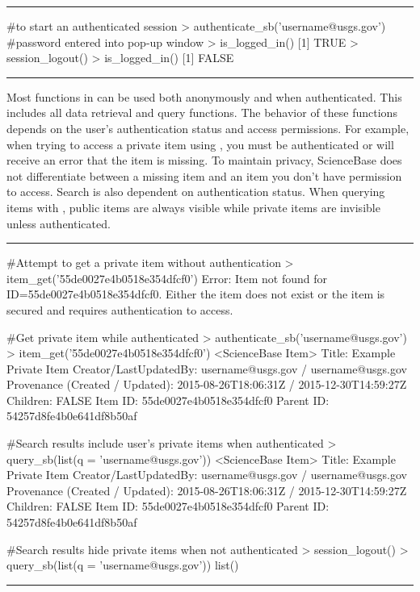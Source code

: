 \noindent\rule{\textwidth}{0.4pt}
\begin{example}
#to start an authenticated session
> authenticate_sb('username@usgs.gov') #password entered into pop-up window
> is_logged_in()
[1] TRUE
> session_logout()
> is_logged_in()
[1] FALSE
\end{example}
\noindent\rule{\textwidth}{0.4pt}

Most functions in  can be used both anonymously and when
authenticated. This includes all data retrieval and query functions. The
behavior of these functions depends on the user's authentication status and
access permissions. For example, when trying to access a private item using
, you must be authenticated or will receive an error that the
item is missing. To maintain privacy, ScienceBase does not differentiate between
a missing item and an item you don't have permission to access. Search is also
dependent on authentication status. When querying items with ,
public items are always visible while private items are invisible unless
authenticated.

\noindent\rule{\textwidth}{0.4pt}
\begin{example}
#Attempt to get a private item without authentication
> item_get('55de0027e4b0518e354dfcf0')
 Error: Item not found for ID=55de0027e4b0518e354dfcf0. Either the
 item does not exist or the item is secured and requires authentication to access.

#Get private item while authenticated
> authenticate_sb('username@usgs.gov')
> item_get('55de0027e4b0518e354dfcf0')
 <ScienceBase Item>
  Title: Example Private Item
  Creator/LastUpdatedBy:     username@usgs.gov / username@usgs.gov
  Provenance (Created / Updated):  2015-08-26T18:06:31Z / 2015-12-30T14:59:27Z
  Children: FALSE
  Item ID: 55de0027e4b0518e354dfcf0
  Parent ID: 54257d8fe4b0e641df8b50af

#Search results include user's private items when authenticated
> query_sb(list(q = 'username@usgs.gov'))
 <ScienceBase Item>
  Title: Example Private Item
  Creator/LastUpdatedBy:     username@usgs.gov / username@usgs.gov
  Provenance (Created / Updated):  2015-08-26T18:06:31Z / 2015-12-30T14:59:27Z
  Children: FALSE
  Item ID: 55de0027e4b0518e354dfcf0
  Parent ID: 54257d8fe4b0e641df8b50af

#Search results hide private items when not authenticated
> session_logout()
> query_sb(list(q = 'username@usgs.gov'))
list()
\end{example}
\noindent\rule{\textwidth}{0.4pt}

